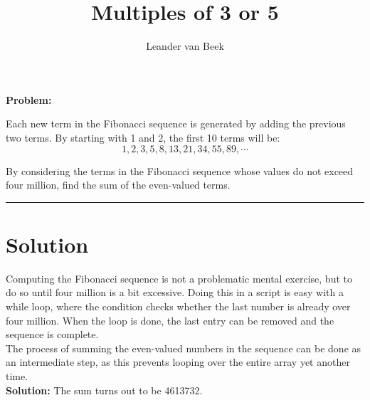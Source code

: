 \documentclass[10pt,a4paper]{article}
\author{Leander van Beek}
\title{Multiples of 3 or 5}
\begin{document}
\maketitle

\textbf{Problem:} 

Each new term in the Fibonacci sequence is generated by adding the previous two terms. By starting with 1 and 2, the first 10 terms will be:\\

\begin{equation}
1, 2, 3, 5, 8, 13, 21, 34, 55, 89, \cdots
\end{equation}

By considering the terms in the Fibonacci sequence whose values do not exceed four million, find the sum of the even-valued terms.


\vspace{0.5cm}
\hrule
\vspace{0.5cm}

\section{Solution}

Computing the Fibonacci sequence is not a problematic mental exercise, but to do so until four million is a bit excessive. Doing this in a script is easy with a while loop, where the condition checks whether the last number is already over four million. When the loop is done, the last entry can be removed and the sequence is complete.\\

The process of summing the even-valued numbers in the sequence can be done as an intermediate step, as this prevents looping over the entire array yet another time.\\

\textbf{Solution:} The sum turns out to be 4613732.
\end{document}
